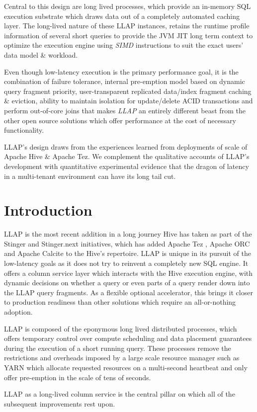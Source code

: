 
Central to this design are long lived processes, which provide an in-memory SQL execution substrate which draws
data out of a completely automated caching layer. The long-lived nature of these LLAP instances, retains the runtime profile
information of several short queries to provide the JVM JIT long term context to optimize the execution engine
using \emph{SIMD} instructions to suit the exact users' data model \& workload.


Even though low-latency execution is the primary performance goal, it is the combination of failure tolerance, 
internal pre-emption model based on dynamic query fragment priority, user-transparent replicated data/index fragment
caching \& eviction, ability to maintain isolation for update/delete ACID transactions and perform out-of-core joins 
that makes \emph{LLAP} an entirely different beast from the other open source solutions which offer performance at the cost
of necessary functionality.


LLAP's design draws from the experiences learned from deployments of scale of Apache Hive \& Apache Tez. We complement
the qualitative accounts of LLAP's development with quantitative experimental evidence that the dragon of latency in
a multi-tenant environment can have its long tail cut.


\section{Introduction}

LLAP is the most recent addition in a long journey Hive has taken as part of the Stinger and Stinger.next initiatives, which has added 
Apache Tez \cite{tez}, Apache ORC \cite{orc} and Apache Calcite \cite{cbo} to the Hive's repertoire.
LLAP is unique in its pursuit of the low-latency goals as it does not try to reinvent a completely new SQL engine. It offers a column service 
layer which interacts with the Hive execution engine, with dynamic decisions on whether a query or even parts of a query render down 
into the LLAP query fragments. As a flexible optional accelerator, this brings it closer to production readiness than other solutions
which require an all-or-nothing adoption. 

LLAP is composed of the eponymous long lived distributed processes, which offers temporary 
control over compute scheduling and data placement guarantees during the execution of a short running 
query. These processes remove the restrictions and overheads imposed by a large scale resource manager
such as YARN\cite{YARN} which allocate requested resources on a multi-second heartbeat and only offer
pre-emption in the scale of tens of seconds.

LLAP as a long-lived column service is the central pillar on which all of the subsequent improvements
rest upon. 
